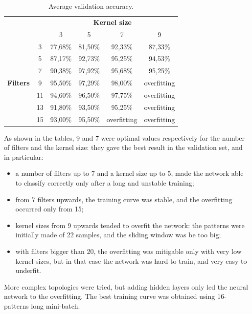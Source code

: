 \begin{table}[ht]
	\centering
	\begin{tabular}{cccccc}
									  &                         & \multicolumn{4}{c}{\textbf{Kernel size}}       \\
									  & \multicolumn{1}{c|}{}   & 3       & 5       & 7            & 9           \\ \cline{2-6} 
	\multirow{7}{*}{\textbf{Filters}} & \multicolumn{1}{c|}{3}  & 77,68\% & 81,50\% & 92,33\%      & 87,33\%     \\
								      & \multicolumn{1}{c|}{5}  & 87,17\% & 92,73\% & 95,25\%      & 94,53\%     \\
									  & \multicolumn{1}{c|}{7}  & 90,38\% & 97,92\% & 95,68\%      & 95,25\%     \\
									  & \multicolumn{1}{c|}{9}  & 95,50\% & 97,29\% & 98,00\%      & overfitting \\
									  & \multicolumn{1}{c|}{11} & 94,60\% & 96,50\% & 97,75\%      & overfitting \\
									  & \multicolumn{1}{c|}{13} & 91,80\% & 93,50\% & 95,25\%      & overfitting \\
									  & \multicolumn{1}{c|}{15} & 93,00\% & 95,50\% & overfitting  & overfitting
	\end{tabular}
	\caption{Average validation accuracy.}
\end{table}
As shown in the tables, 9 and 7 were optimal values respectively for the number of filters and the kernel size: they gave the best result in the validation set, and in particular:
\begin{itemize}
	\item a number of filters up to 7 and a kernel size up to 5, made the network able to classify correctly only after a long and unstable training;
	\item from 7 filters upwards, the training curve was stable, and the overfitting occurred only from 15;
	\item kernel sizes from 9 upwards tended to overfit the network: the patterns were initially made of 22 samples, and the sliding window was be too big;
	\item with filters bigger than 20, the overfitting was mitigable only with very low kernel sizes, but in that case the network was hard to train, and very easy to underfit.
\end{itemize}
More complex topologies were tried, but adding hidden layers only led the neural network to the overfitting. The best training curve was obtained using 16-patterns long mini-batch.

